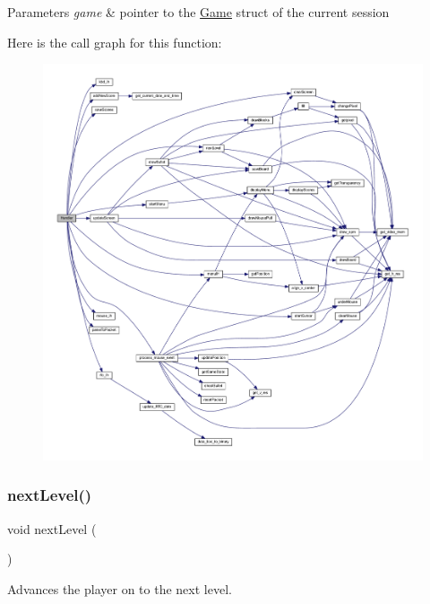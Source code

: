 \begin{DoxyParams}{Parameters}
{\em game} & pointer to the \mbox{\hyperlink{struct_game}{Game}} struct of the current session \\
\hline
\end{DoxyParams}
Here is the call graph for this function\+:
\nopagebreak
\begin{figure}[H]
\begin{center}
\leavevmode
\includegraphics[width=350pt]{group__game_ga5b0e92642a5a6f7584bf752ebf7d91e6_cgraph}
\end{center}
\end{figure}
\mbox{\label{group__game_gac165fe517b083b5ccd861bf028a67b7e}} 
\subsubsection{\texorpdfstring{nextLevel()}{nextLevel()}}
{\footnotesize\ttfamily void next\+Level (\begin{DoxyParamCaption}{ }\end{DoxyParamCaption})}



Advances the player on to the next level. 

